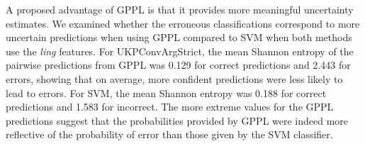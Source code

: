 % 


A proposed advantage of GPPL is that it provides more meaningful uncertainty estimates. 
We examined whether the erroneous classifications correspond to more uncertain predictions
when using GPPL compared to SVM when both methods use the \emph{ling} features.
For UKPConvArgStrict, the mean Shannon entropy
of the pairwise predictions from GPPL 
was 0.129 for correct predictions and 2.443 for errors,
showing that on average, more confident predictions were less likely to lead to errors.
For SVM, the mean Shannon entropy was  0.188 for correct predictions and 
1.583 for incorrect.
The more extreme values for the GPPL predictions 
 suggest that the probabilities provided by GPPL were indeed more reflective of 
 the probability of error than those given by the SVM classifier.

